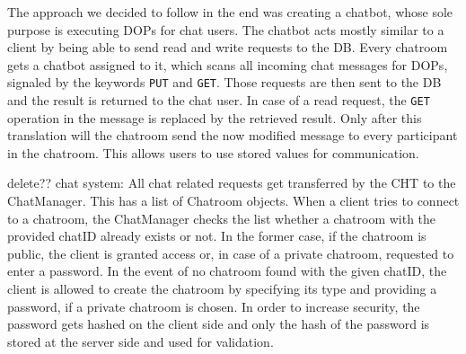 The approach we decided to follow in the end was creating a chatbot, whose sole purpose is executing DOPs for chat users. The chatbot acts mostly similar to a client by being able to send read and write requests to the DB. Every chatroom gets a chatbot assigned to it, which scans all incoming chat messages for DOPs, signaled by the keywords \texttt{PUT} and \texttt{GET}. Those requests are then sent to the DB and the result is returned to the chat user. In case of a read request, the \texttt{GET} operation in the message is replaced by the retrieved result. Only after this translation will the chatroom send the now modified message to every participant in the chatroom. This allows users to use stored values for communication.

delete??
chat system:
All chat related requests get transferred by the CHT to the ChatManager. This has a list of Chatroom objects. When a client tries to connect to a chatroom, the ChatManager checks the list whether a chatroom with the provided chatID already exists or not. In the former case, 
if the chatroom is public, the client is granted access or, in case of a private chatroom, requested to enter a password. In the event of no chatroom found with the given chatID, the client is allowed to create the chatroom by specifying its type and providing a password, if a private chatroom is chosen. In order to increase security, the password gets hashed on the client side and only the hash of the password is stored at the server side and used for validation.